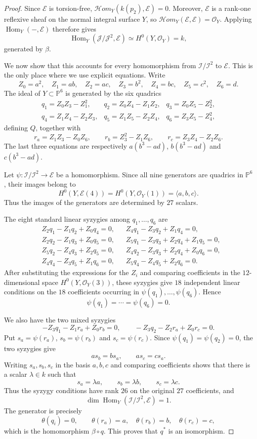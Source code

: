 \documentclass[11pt,twoside]{amsart}
\theoremstyle{plain}
\numberwithin{equation}{section}
\theoremstyle{definition}
\begin{document}
\begin{proof}
Since $\mathcal E$ is torsion-free, $\mathcal H om_Y(k(p_2),\mathcal E)=0$. Moreover, $\mathcal E$ is a rank-one reflexive sheaf on the normal integral surface $Y$, so $\mathcal H om_Y(\mathcal E,\mathcal E)=\mathcal O_Y$. Applying $\operatorname{Hom}_Y(-,\mathcal E)$ therefore gives
$$
\operatorname{Hom}_Y(\mathcal J/\mathcal J^2,\mathcal E)
\simeq H^0(Y,\mathcal O_Y)=k,
$$
generated by $\beta$.

We now show that this accounts for every homomorphism from $\mathcal I/\mathcal I^2$ to $\mathcal E$. This is the only place where we use explicit equations. Write
$$
Z_0=a^2,\quad Z_1=ab,\quad Z_2=ac,\quad
Z_3=b^2,\quad Z_4=bc,\quad Z_5=c^2,\quad Z_6=d.
$$
The ideal of $Y\subset\mathbb P^6$ is generated by the six quadrics
$$
\begin{array}{lll}
q_1=Z_0Z_3-Z_1^2, &
q_2=Z_0Z_4-Z_1Z_2, &
q_3=Z_0Z_5-Z_2^2, \\[2pt]
q_4=Z_1Z_4-Z_2Z_3, &
q_5=Z_1Z_5-Z_2Z_4, &
q_6=Z_3Z_5-Z_4^2,
\end{array}
$$
defining $Q$, together with
$$
r_a=Z_1Z_3-Z_0Z_6,\qquad
r_b=Z_3^2-Z_1Z_6,\qquad
r_c=Z_3Z_4-Z_2Z_6.
$$
The last three equations are respectively $a(b^3-ad)$, $b(b^3-ad)$ and $c(b^3-ad)$.

Let $\psi:\mathcal I/\mathcal I^2\to\mathcal E$ be a homomorphism. Since all nine generators are quadrics in $\mathbb P^6$, their images belong to
$$
H^0(Y,\mathcal E(4))
=H^0(Y,\mathcal O_Y(1))
=\langle a,b,c\rangle.
$$
Thus the images of the generators are determined by $27$ scalars.

The eight standard linear syzygies among $q_1,\ldots,q_6$ are
$$
\begin{aligned}
&Z_2q_1-Z_1q_2+Z_0q_4=0, &&
Z_4q_1-Z_3q_2+Z_1q_4=0,\\
&Z_2q_2-Z_1q_3+Z_0q_5=0, &&
Z_5q_1-Z_3q_3+Z_2q_4+Z_1q_5=0,\\
&Z_5q_2-Z_4q_3+Z_2q_5=0, &&
Z_4q_2-Z_3q_3+Z_2q_4+Z_0q_6=0,\\
&Z_4q_4-Z_3q_5+Z_1q_6=0, &&
Z_5q_4-Z_4q_5+Z_2q_6=0.
\end{aligned}
$$
After substituting the expressions for the $Z_i$ and comparing coefficients in the $12$-dimensional space $H^0(Y,\mathcal O_Y(3))$, these syzygies give $18$ independent linear conditions on the $18$ coefficients occurring in $\psi(q_1),\ldots,\psi(q_6)$. Hence
$$
\psi(q_1)=\cdots=\psi(q_6)=0.
$$

We also have the two mixed syzygies
$$
-Z_3q_1-Z_1r_a+Z_0r_b=0,
\qquad
-Z_3q_2-Z_2r_a+Z_0r_c=0.
$$
Put $s_a=\psi(r_a)$, $s_b=\psi(r_b)$ and $s_c=\psi(r_c)$. Since $\psi(q_1)=\psi(q_2)=0$, the two syzygies give
$$
a s_b=b s_a,
\qquad
a s_c=c s_a.
$$
Writing $s_a,s_b,s_c$ in the basis $a,b,c$ and comparing coefficients shows that there is a scalar $\lambda\in k$ such that
$$
s_a=\lambda a,\qquad
s_b=\lambda b,\qquad
s_c=\lambda c.
$$
Thus the syzygy conditions have rank $26$ on the original $27$ coefficients, and
$$
\dim\operatorname{Hom}_Y(\mathcal I/\mathcal I^2,\mathcal E)=1.
$$
The generator is precisely
$$
\theta(q_i)=0,\qquad
\theta(r_a)=a,\quad
\theta(r_b)=b,\quad
\theta(r_c)=c,
$$
which is the homomorphism $\beta\circ q$. This proves that $q^*$ is an isomorphism.


\end{proof}
\end{document}

